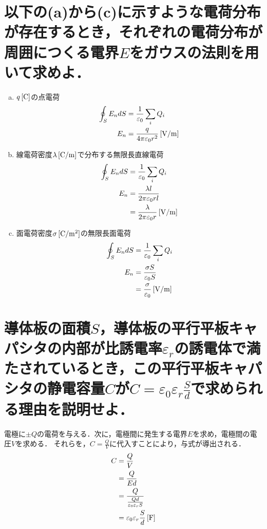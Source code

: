 \documentclass[dvipdfmx]{ujarticle}
\begin{document}
\section{以下の(a)から(c)に示すような電荷分布が存在するとき，それぞれの電荷分布が周囲につくる電界$E$をガウスの法則を用いて求めよ．}
\begin{enumerate}[(a)]
	\item $q\,[\rm{C}]$の点電荷
	\begin{align*}
		\oint_{S} E_{n} dS&=\frac{1}{\varepsilon_{0}} \sum_{i} Q_{i}\\
		E_{n}&=\frac{q}{4\pi \varepsilon_{0} r^{2}}\,[\rm{V/m}]
	\end{align*}
	\item 線電荷密度$\lambda\,[\rm{C/m}]$で分布する無限長直線電荷
	\begin{align*}
		\oint_{S} E_{n} dS&=\frac{1}{\varepsilon_{0}} \sum_{i} Q_{i}\\
		E_{n}&=\frac{\lambda l}{2\pi \varepsilon_{0}r l}\\
		&=\frac{\lambda}{2\pi \varepsilon_{0}r}\,[\rm{V/m}]
	\end{align*}
	\item 面電荷密度$\sigma\,[\rm{C/m^{2}}]$の無限長面電荷
	\begin{align*}
		\oint_{S} E_{n} dS&=\frac{1}{\varepsilon_{0}} \sum_{i} Q_{i}\\
		E_{n}&=\frac{\sigma S}{\varepsilon_{0}S}\\
		&=\frac{\sigma}{\varepsilon_{0}}\,[\rm{V/m}]
	\end{align*}
\end{enumerate}

\section{導体板の面積$S$，導体板の平行平板キャパシタの内部が比誘電率$\varepsilon_{r}$の誘電体で満たされているとき，この平行平板キャパシタの静電容量$C$が$C=\varepsilon_{0}\varepsilon_{r}\frac{S}{d}$で求められる理由を説明せよ．}
電極に$\pm Q$の電荷を与える．次に，電極間に発生する電界$E$を求め，電極間の電圧$V$を求める．
それらを，$C=\frac{Q}{V}$に代入すことにより，与式が導出される．
\begin{align*}
	C&=\frac{Q}{V}\\
	&=\frac{Q}{Ed}\\
	&=\frac{Q}{\frac{Qd}{\varepsilon_{0}\varepsilon_{r}S}}\\
	&=\varepsilon_{0}\varepsilon_{r}\frac{S}{d}\,[\rm{F}]
\end{align*}
\end{document}
